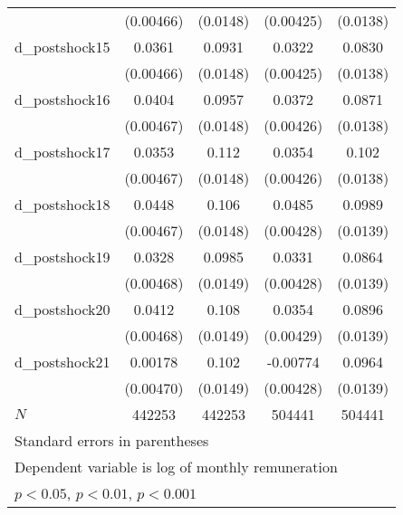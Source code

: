 {\begin{tabular}{l*{4}{c}}
          &(0.00466)         & (0.0148)         &(0.00425)         & (0.0138)         \\
d\_postshock15&   0.0361\sym{***}&   0.0931\sym{***}&   0.0322\sym{***}&   0.0830\sym{***}\\
          &(0.00466)         & (0.0148)         &(0.00425)         & (0.0138)         \\
d\_postshock16&   0.0404\sym{***}&   0.0957\sym{***}&   0.0372\sym{***}&   0.0871\sym{***}\\
          &(0.00467)         & (0.0148)         &(0.00426)         & (0.0138)         \\
d\_postshock17&   0.0353\sym{***}&    0.112\sym{***}&   0.0354\sym{***}&    0.102\sym{***}\\
          &(0.00467)         & (0.0148)         &(0.00426)         & (0.0138)         \\
d\_postshock18&   0.0448\sym{***}&    0.106\sym{***}&   0.0485\sym{***}&   0.0989\sym{***}\\
          &(0.00467)         & (0.0148)         &(0.00428)         & (0.0139)         \\
d\_postshock19&   0.0328\sym{***}&   0.0985\sym{***}&   0.0331\sym{***}&   0.0864\sym{***}\\
          &(0.00468)         & (0.0149)         &(0.00428)         & (0.0139)         \\
d\_postshock20&   0.0412\sym{***}&    0.108\sym{***}&   0.0354\sym{***}&   0.0896\sym{***}\\
          &(0.00468)         & (0.0149)         &(0.00429)         & (0.0139)         \\
d\_postshock21&  0.00178         &    0.102\sym{***}& -0.00774         &   0.0964\sym{***}\\
          &(0.00470)         & (0.0149)         &(0.00428)         & (0.0139)         \\
\hline
\(N\)     &   442253         &   442253         &   504441         &   504441         \\
\hline\hline
\multicolumn{5}{l}{\footnotesize Standard errors in parentheses}\\
\multicolumn{5}{l}{\footnotesize Dependent variable is log of monthly remuneration}\\
\multicolumn{5}{l}{\footnotesize \sym{*} \(p<0.05\), \sym{**} \(p<0.01\), \sym{***} \(p<0.001\)}\\
\end{tabular}
}
